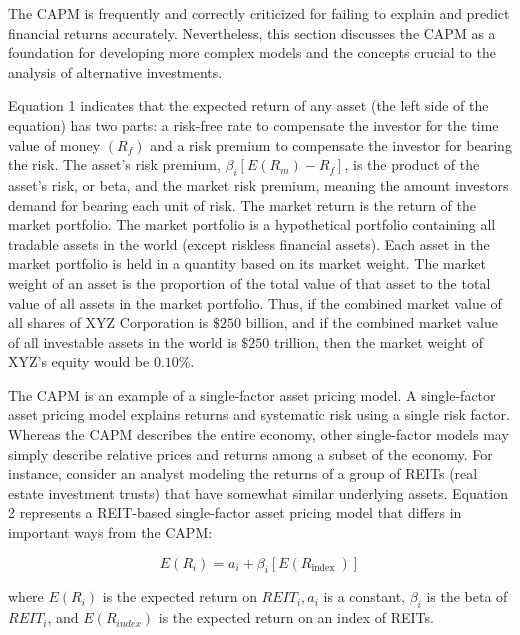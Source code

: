 \documentclass[11pt]{article}
\begin{document}
The CAPM is frequently and correctly criticized for failing to explain and predict financial returns accurately. Nevertheless, this section discusses the CAPM as a foundation for developing more complex models and the concepts crucial to the analysis of alternative investments.

Equation 1 indicates that the expected return of any asset (the left side of the equation) has two parts: a risk-free rate to compensate the investor for the time value of money $\left(R_{f}\right)$ and a risk premium to compensate the investor for bearing the risk. The asset's risk premium, $\beta_{i}\left[E\left(R_{m}\right)-R_{f}\right]$, is the product of the asset's risk, or beta, and the market risk premium, meaning the amount investors demand for bearing each unit of risk. The market return is the return of the market portfolio. The market portfolio is a hypothetical portfolio containing all tradable assets in the world (except riskless financial assets). Each asset in the market portfolio is held in a quantity based on its market weight. The market weight of an asset is the proportion of the total value of that asset to the total value of all assets in the market portfolio. Thus, if the combined market value of all shares of XYZ Corporation is $\$ 250$ billion, and if the combined market value of all investable assets in the world is $\$ 250$ trillion, then the market weight of XYZ's equity would be $0.10 \%$.

The CAPM is an example of a single-factor asset pricing model. A single-factor asset pricing model explains returns and systematic risk using a single risk factor. Whereas the CAPM describes the entire economy, other single-factor models may simply describe relative prices and returns among a subset of the economy. For instance, consider an analyst modeling the returns of a group of REITs (real estate investment trusts) that have somewhat similar underlying assets. Equation 2 represents a REIT-based single-factor asset pricing model that differs in important ways from the CAPM:


\begin{equation*}
E\left(R_{i}\right)=a_{i}+\beta_{i}\left[E\left(R_{\text {index }}\right)\right] \tag{2}
\end{equation*}


where $E\left(R_{i}\right)$ is the expected return on $R E I T_{i}, a_{i}$ is a constant, $\beta_{i}$ is the beta of $R E I T_{i}$, and $E\left(R_{i n d e x}\right)$ is the expected return on an index of REITs.
\end{document}
